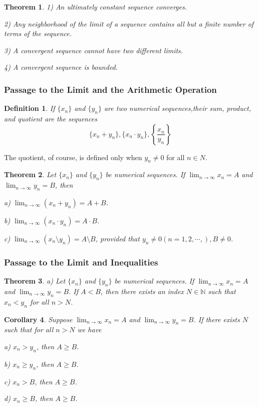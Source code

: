 \documentclass[a4paper,12pt]{article} %
\newtheorem{definition}{Definition}[section]
\newtheorem{theorem}{Theorem}[section]
\newtheorem{corollary}[theorem]{Corollary}
\begin{document}
\begin{theorem}
    1) An ultimately constant sequence converges.

    2) Any neighborhood of the limit of a sequence contains all but 
    a finite number of terms of the sequence.

    3) A convergent sequence cannot have two different limits.

    4) A convergent sequence is bounded.
\end{theorem}

\subsubsection{Passage to the Limit and the Arithmetic Operation}
\begin{definition}
    If $\{x_n\}$ and $\{y_n\}$ are two numerical sequences,their sum, 
    product, and quotient are the sequences
    \[\{x_n+y_n\}, \{x_n \cdot y_n\}, \left\{\frac{x_n}{y_n}\right\}\]
\end{definition}
The quotient, of course, is defined only when $y_n\ne 0$ for all $n \in N$.

\begin{theorem}
    Let $\{x_n\}$ and $\{y_n\}$ be numerical sequences. If $\displaystyle \lim_{n\to \infty}
    x_n =A$ and $\displaystyle \lim_{n\to \infty} y_n =B$, then 

    {\rm a)} $\displaystyle \lim_{n\to \infty}\left(x_n+y_n \right) = A+B$.
    
    {\rm b)} $\displaystyle \lim_{n\to \infty}\left(x_n \cdot y_n \right) = A \cdot B$.

    {\rm c)} $\displaystyle \lim_{n\to \infty}\left(x_n \setminus y_n \right) = A \setminus B$,
    provided that $y_n \ne 0 (n=1,2,\cdots,),B\ne0$.
\end{theorem}

\subsubsection{Passage to the Limit and Inequalities}
\begin{theorem}
    {\rm a) } Let $\{x_n\}$ and $\{y_n\}$ be numerical sequences. If $\displaystyle \lim_{n\to \infty}
    x_n =A$ and $\displaystyle \lim_{n\to \infty} y_n =B$. If $A < B$, then there exists an 
    index $N \in \mathbb{N}$ such that $x_n < y_n$  for all $n > N$.
\end{theorem}
\begin{corollary}
    Suppose $\displaystyle \lim_{n\to \infty}
    x_n =A$ and $\displaystyle \lim_{n\to \infty} y_n =B$.
    If there exists $N$ such that for all $n > N$ we have 

    {\rm a)} $x_n > y_n$, then $A \ge B$.

    {\rm b)} $x_n \ge y_n$, then $A \ge B$.

    {\rm c)} $x_n > B$, then $A \ge B$.

    {\rm d)} $x_n \ge B$, then $A \ge B$.
\end{corollary}
\end{document}
